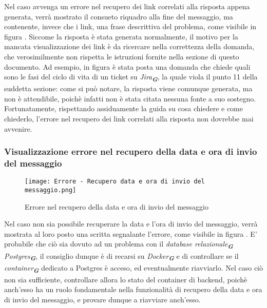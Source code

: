 Nel caso avvenga un errore nel recupero dei link correlati alla risposta appena generata, verrà mostrato il consueto riquadro alla fine del messaggio, ma contenente, invece che i link, una frase descrittiva del problema, come visibile in figura . Siccome la risposta è stata generata normalmente, il motivo per la mancata visualizzazione dei link è da ricercare nella correttezza della domanda, che verosimilmente non rispetta le istruzioni fornite nella sezione  di questo documento. Ad esempio, in figura è stata posta una domanda che chiede quali sono le fasi del ciclo di vita di un ticket su \emph{Jira}\textsubscript{\textbf{\textit{G}}}, la quale viola il punto 11 della suddetta sezione: come si può notare, la risposta viene comunque generata, ma non è attendibile, poichè infatti non è stata citata nessuna fonte a suo sostegno. Fortunatamente, rispettando assiduamente la guida su cosa chiedere e come chiederlo, l'errore nel recupero dei link correlati alla risposta non dovrebbe mai avvenire.


\subsubsection{Visualizzazione errore nel recupero della data e ora di invio del messaggio}

\begin{figure}[h]
    \centering
        \texttt{[image: Errore - Recupero data e ora di invio del messaggio.png]}
        \caption{Errore nel recupero della data e ora di invio del messaggio}
        \label{fig:Errore nel recupero della data e ora di invio del messaggio}
\end{figure}

Nel caso non sia possibile recuperare la data e l'ora di invio del messaggio, verrà mostrata al loro posto una scritta segnalante l'errore, come visibile in figura . E' probabile che ciò sia dovuto ad un problema con il \emph{database relazionale}\textsubscript{\textbf{\textit{G}}} \emph{Postgres}\textsubscript{\textbf{\textit{G}}}, il consiglio dunque è di recarsi su \emph{Docker}\textsubscript{\textbf{\textit{G}}} e di controllare se il \emph{container}\textsubscript{\textbf{\textit{G}}} dedicato a Postgres è acceso, ed eventualmente riavviarlo. Nel caso ciò non sia sufficiente, controllare allora lo stato del container di backend, poichè anch'esso ha un ruolo fondamentale nella funzionalità di recupero della data e ora di invio del messaggio, e provare dunque a riavviare anch'esso.


